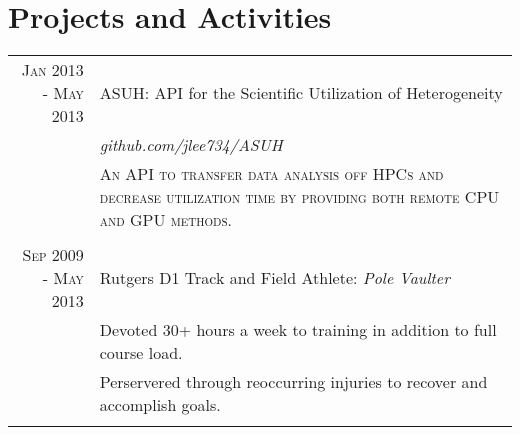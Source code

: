 \documentclass[a4paper,10pt, onepage]{article} %
\begin{document}
\section{Projects and Activities}

\begin{tabular}{rp{10cm}}
\textsc{Jan 2013 - May 2013} & ASUH: API for the Scientific Utilization of Heterogeneity\\
& \small\emph{github.com/jlee734/ASUH}\\
& \small\textsc{An API to transfer data analysis off HPCs and decrease utilization time by providing both remote CPU and GPU methods.}\\
\multicolumn{2}{c}{}\\

\textsc{Sep 2009 - May 2013} & Rutgers D1 Track and Field Athlete: \emph{Pole Vaulter}\\
& \small{Devoted 30+ hours a week to training in addition to full course load.}\\
& \small{Perservered through reoccurring injuries to recover and accomplish goals.}\\
\multicolumn{2}{c}{}\\


\end{tabular}




\end{document}
